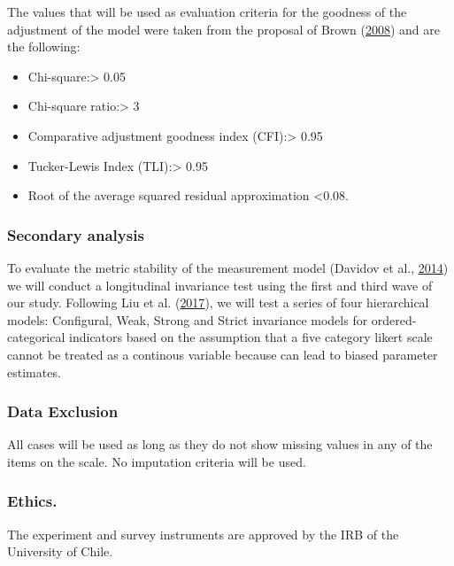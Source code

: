 \documentclass[
]{article}
\providecommand{\tightlist}{%
  \setlength{\itemsep}{0pt}\setlength{\parskip}{0pt}}
\begin{document}
The values that will be used as evaluation criteria for the goodness of
the adjustment of the model were taken from the proposal of Brown
(\protect\hyperlink{ref-Brown2008}{2008}) and are the following:

\begin{itemize}
\tightlist
\item
  Chi-square:\textgreater{} 0.05
\item
  Chi-square ratio:\textgreater{} 3
\item
  Comparative adjustment goodness index (CFI):\textgreater{} 0.95
\item
  Tucker-Lewis Index (TLI):\textgreater{} 0.95
\item
  Root of the average squared residual approximation \textless0.08.
\end{itemize}

\hypertarget{secondary-analysis}{%
\subsubsection{Secondary analysis}\label{secondary-analysis}}

To evaluate the metric stability of the measurement model (Davidov et
al., \protect\hyperlink{ref-Davidovetal2014}{2014}) we will conduct a
longitudinal invariance test using the first and third wave of our
study. Following Liu et al.
(\protect\hyperlink{ref-liuTestingMeasurementInvariance2017}{2017}), we
will test a series of four hierarchical models: Configural, Weak, Strong
and Strict invariance models for ordered-categorical indicators based on
the assumption that a five category likert scale cannot be treated as a
continous variable because can lead to biased parameter estimates.

\hypertarget{data-exclusion}{%
\subsubsection{Data Exclusion}\label{data-exclusion}}

All cases will be used as long as they do not show missing values in any
of the items on the scale. No imputation criteria will be used.

\hypertarget{ethics.}{%
\subsubsection{Ethics.}\label{ethics.}}

The experiment and survey instruments are approved by the IRB of the
University of Chile.
\end{document}
